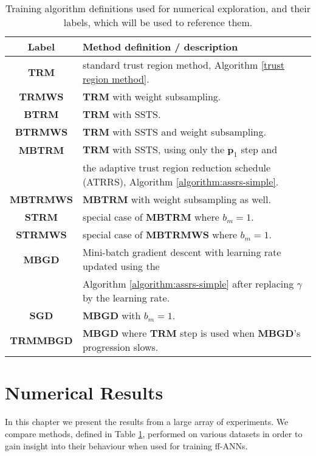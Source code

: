 \documentclass[letterpaper,12pt,titlepage,oneside,final]{book}
\begin{document}
	\begin{table}[h]
		\begin{center}
			\begin{tabular}{ |c|l| }  
				\hline
				\textbf{Label} & \textbf{Method definition / description}  \\
				\hline
				\textbf{TRM} &  standard trust region method, Algorithm \ref{trust region method}. \\
				\textbf{TRMWS} & \textbf{TRM} with weight subsampling. \\
				\textbf{BTRM} & \textbf{TRM} with SSTS.\\
				\textbf{BTRMWS} & \textbf{TRM} with SSTS and weight subsampling.  \\
				\textbf{MBTRM} & \textbf{TRM} with SSTS, using only the $\mathbf{p}_{1}$ step and \\ &
				the adaptive trust region reduction schedule (ATRRS), Algorithm \ref{algorithm:assrs-simple}. \\ 
				\textbf{MBTRMWS} & \textbf{MBTRM} with weight subsampling as well. \\
				\textbf{STRM} & special case of \textbf{MBTRM} where $b_{m} = 1$. \\
				\textbf{STRMWS} & special case of \textbf{MBTRMWS} where $b_{m} = 1$. \\
				\textbf{MBGD} & Mini-batch gradient descent with learning rate updated using the \\ & Algorithm \ref{algorithm:assrs-simple}  after replacing $\gamma$ by the learning rate.\\
				\textbf{SGD} & \textbf{MBGD} with $b_{m} = 1$. \\
				\textbf{TRMMBGD} & \textbf{MBGD} where \textbf{TRM} step is used when \textbf{MBGD}'s progression slows. \\
				\hline
			\end{tabular}
			\caption{Training algorithm definitions used for numerical exploration, and their labels, which will be used to reference them.}
			\label{table:algorithms}
		\end{center}
	\end{table}
	
	
	\chapter{Numerical Results}
	
	
	In this chapter we present the results from a large array of experiments. We compare methods, defined in Table \ref{table:algorithms}, performed on various datasets in order to gain insight into their behaviour when used for training ff-ANNs. 
	
\end{document}
